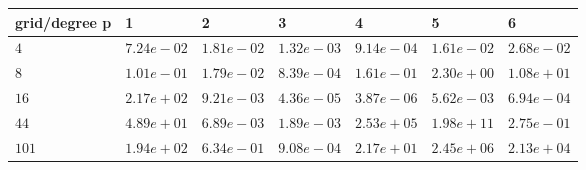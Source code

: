 \begin{tabular}{lllllll}
\hline
 grid/degree p   & 1          & 2          & 3          & 4          & 5          & 6          \\
\hline
 $4$             & $7.24e-02$ & $1.81e-02$ & $1.32e-03$ & $9.14e-04$ & $1.61e-02$ & $2.68e-02$ \\
 $8$             & $1.01e-01$ & $1.79e-02$ & $8.39e-04$ & $1.61e-01$ & $2.30e+00$ & $1.08e+01$ \\
 $16$            & $2.17e+02$ & $9.21e-03$ & $4.36e-05$ & $3.87e-06$ & $5.62e-03$ & $6.94e-04$ \\
 $44$            & $4.89e+01$ & $6.89e-03$ & $1.89e-03$ & $2.53e+05$ & $1.98e+11$ & $2.75e-01$ \\
 $101$           & $1.94e+02$ & $6.34e-01$ & $9.08e-04$ & $2.17e+01$ & $2.45e+06$ & $2.13e+04$ \\
\hline
\end{tabular}